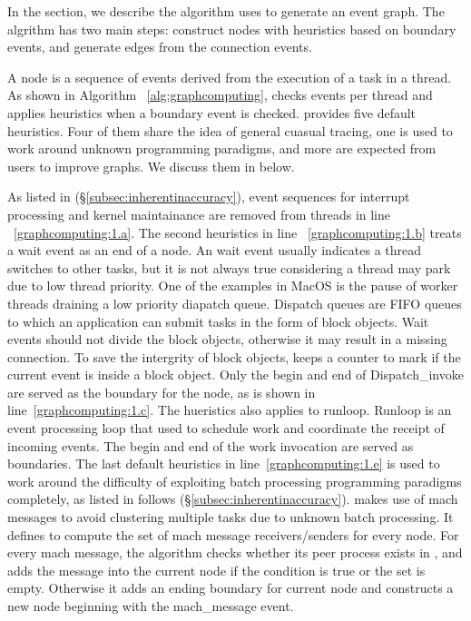 In the section, we describe the algorithm \xxx uses to generate an event graph.
The algrithm has two main steps: construct nodes with heuristics based on
boundary events, and generate edges from the connection events.

A node is a sequence of events derived from the execution of a task in a thread.
As shown in Algorithm ~\ref{alg:graphcomputing}, \xxx checks events per
thread and applies heuristics when a boundary event is checked. \xxx provides
five default heuristics. Four of them share the idea of general cuasual tracing,
one is used to work around unknown programming paradigms, and more are expected
from users to improve graphs. We discuss them in below.

As listed in (\S\ref{subsec:inherentinaccuracy}), event sequences
for interrupt processing and kernel maintainance are removed from
threads in line ~\ref{graphcomputing:1.a}. The second heuristics in line
~\ref{graphcomputing:1.b} treats a wait event as an end of a node. An wait event
usually indicates a thread switches to other tasks, but it is not always true
considering a thread may park due to low thread priority. One of the examples
in MacOS is the pause of worker threads draining a low priority diapatch queue.
Dispatch queues are FIFO queues to which an application can submit tasks in
the form of block objects. Wait events should not divide the block objects,
otherwise it may result in a missing connection. To save the intergrity of block
objects, \xxx keeps a counter  to mark if the current event
is inside a block object. Only the begin and end of Dispatch\_invoke are served
as the boundary for the node, as is shown in line~\ref{graphcomputing:1.c}.
The hueristics also applies to runloop. Runloop is an event processing loop
that used to schedule work and coordinate the receipt of incoming events.
The begin and end of the work invocation are served as boundaries. The last
default heuristics in line~\ref{graphcomputing:1.e} is used to work around the
difficulty of exploiting batch processing programming paradigms completely, as
listed in follows (\S\ref{subsec:inherentinaccuracy}). \xxx makes use of mach
messages to avoid clustering multiple tasks due to unknown batch processing. It
defines  to compute the set of mach message receivers/senders
for every node. For every mach message, the algorithm checks whether its peer
process exists in , and adds the message into the current
node if the condition is true or the set is empty. Otherwise it adds an
ending boundary for current node and constructs a new node beginning with the
mach\_message event.

